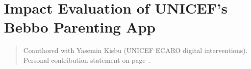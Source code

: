 \chapter[Evaluating the Bebbo App]{Impact Evaluation of UNICEF's Bebbo Parenting App}
\label{ch:bebbo}

\begin{quotation}
  \noindent\small Coauthored with Yasemin Kisbu (UNICEF ECARO digital
  interventions). Personal contribution statement on
  page~\pageref{coauthor-statements}.
\end{quotation}



\printbibliography[heading=subbibliography, title={References for Chapter \thechapter}]
